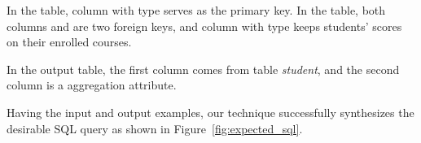 In the  table, column {} with
 type serves as the primary key. 
In the  table, both columns {} and
{} are two foreign keys, and column {}
with  type keeps students' scores on their enrolled courses.

In the output table, the first column  {}
comes from table \textit{student}, and the second column {}
is a aggregation attribute.%

Having the input and output examples, our technique successfully synthesizes
the desirable SQL query as shown in Figure~\ref{fig:expected_sql}.
